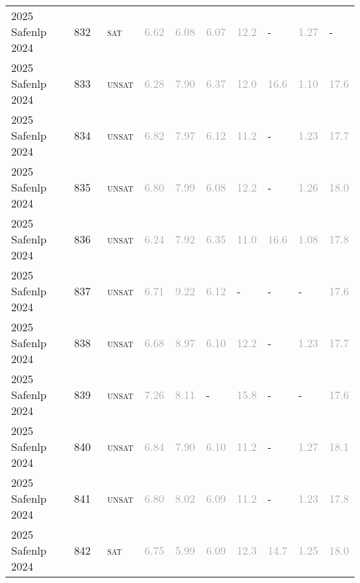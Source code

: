 \begin{center}
{\begin{longtable}{@{}llllllllll@{}}
2025 Safenlp 2024 & 832 & ~\textsc{sat} & \textcolor{darkgray}{6.62} & \textcolor{darkgray}{6.08} & \textcolor{darkgray}{6.07} & \textcolor{darkgray}{12.2} & - & \textcolor{darkgray}{1.27} & - \\
2025 Safenlp 2024 & 833 & ~\textsc{unsat} & \textcolor{darkgray}{6.28} & \textcolor{darkgray}{7.90} & \textcolor{darkgray}{6.37} & \textcolor{darkgray}{12.0} & \textcolor{darkgray}{16.6} & \textcolor{darkgray}{1.10} & \textcolor{darkgray}{17.6} \\
2025 Safenlp 2024 & 834 & ~\textsc{unsat} & \textcolor{darkgray}{6.82} & \textcolor{darkgray}{7.97} & \textcolor{darkgray}{6.12} & \textcolor{darkgray}{11.2} & - & \textcolor{darkgray}{1.23} & \textcolor{darkgray}{17.7} \\
2025 Safenlp 2024 & 835 & ~\textsc{unsat} & \textcolor{darkgray}{6.80} & \textcolor{darkgray}{7.99} & \textcolor{darkgray}{6.08} & \textcolor{darkgray}{12.2} & - & \textcolor{darkgray}{1.26} & \textcolor{darkgray}{18.0} \\
2025 Safenlp 2024 & 836 & ~\textsc{unsat} & \textcolor{darkgray}{6.24} & \textcolor{darkgray}{7.92} & \textcolor{darkgray}{6.35} & \textcolor{darkgray}{11.0} & \textcolor{darkgray}{16.6} & \textcolor{darkgray}{1.08} & \textcolor{darkgray}{17.8} \\
2025 Safenlp 2024 & 837 & ~\textsc{unsat} & \textcolor{darkgray}{6.71} & \textcolor{darkgray}{9.22} & \textcolor{darkgray}{6.12} & - & - & - & \textcolor{darkgray}{17.6} \\
2025 Safenlp 2024 & 838 & ~\textsc{unsat} & \textcolor{darkgray}{6.68} & \textcolor{darkgray}{8.97} & \textcolor{darkgray}{6.10} & \textcolor{darkgray}{12.2} & - & \textcolor{darkgray}{1.23} & \textcolor{darkgray}{17.7} \\
2025 Safenlp 2024 & 839 & ~\textsc{unsat} & \textcolor{darkgray}{7.26} & \textcolor{darkgray}{8.11} & - & \textcolor{darkgray}{15.8} & - & - & \textcolor{darkgray}{17.6} \\
2025 Safenlp 2024 & 840 & ~\textsc{unsat} & \textcolor{darkgray}{6.84} & \textcolor{darkgray}{7.90} & \textcolor{darkgray}{6.10} & \textcolor{darkgray}{11.2} & - & \textcolor{darkgray}{1.27} & \textcolor{darkgray}{18.1} \\
2025 Safenlp 2024 & 841 & ~\textsc{unsat} & \textcolor{darkgray}{6.80} & \textcolor{darkgray}{8.02} & \textcolor{darkgray}{6.09} & \textcolor{darkgray}{11.2} & - & \textcolor{darkgray}{1.23} & \textcolor{darkgray}{17.8} \\
2025 Safenlp 2024 & 842 & ~\textsc{sat} & \textcolor{darkgray}{6.75} & \textcolor{darkgray}{5.99} & \textcolor{darkgray}{6.09} & \textcolor{darkgray}{12.3} & \textcolor{darkgray}{14.7} & \textcolor{darkgray}{1.25} & \textcolor{darkgray}{18.0} \\

\end{longtable}}
\end{center}
